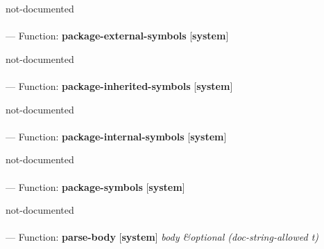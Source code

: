 \begin{adjustwidth}{5em}{5em}
not-documented
\end{adjustwidth}

\paragraph{}
\label{SYSTEM:PACKAGE-EXTERNAL-SYMBOLS}
--- Function: \textbf{package-external-symbols} [\textbf{system}] \textit{}

\begin{adjustwidth}{5em}{5em}
not-documented
\end{adjustwidth}

\paragraph{}
\label{SYSTEM:PACKAGE-INHERITED-SYMBOLS}
--- Function: \textbf{package-inherited-symbols} [\textbf{system}] \textit{}

\begin{adjustwidth}{5em}{5em}
not-documented
\end{adjustwidth}

\paragraph{}
\label{SYSTEM:PACKAGE-INTERNAL-SYMBOLS}
--- Function: \textbf{package-internal-symbols} [\textbf{system}] \textit{}

\begin{adjustwidth}{5em}{5em}
not-documented
\end{adjustwidth}

\paragraph{}
\label{SYSTEM:PACKAGE-SYMBOLS}
--- Function: \textbf{package-symbols} [\textbf{system}] \textit{}

\begin{adjustwidth}{5em}{5em}
not-documented
\end{adjustwidth}

\paragraph{}
\label{SYSTEM:PARSE-BODY}
--- Function: \textbf{parse-body} [\textbf{system}] \textit{body \&optional (doc-string-allowed t)}

